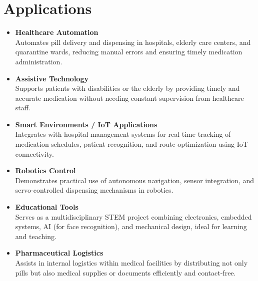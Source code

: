 \section{Applications}

\begin{itemize}
    \item \textbf{Healthcare Automation} \\
    Automates pill delivery and dispensing in hospitals, elderly care centers, and quarantine wards, reducing manual errors and ensuring timely medication administration.

    \item \textbf{Assistive Technology} \\
    Supports patients with disabilities or the elderly by providing timely and accurate medication without needing constant supervision from healthcare staff.

    \item \textbf{Smart Environments / IoT Applications} \\
    Integrates with hospital management systems for real-time tracking of medication schedules, patient recognition, and route optimization using IoT connectivity.

    \item \textbf{Robotics Control} \\
    Demonstrates practical use of autonomous navigation, sensor integration, and servo-controlled dispensing mechanisms in robotics.

    \item \textbf{Educational Tools} \\
    Serves as a multidisciplinary STEM project combining electronics, embedded systems, AI (for face recognition), and mechanical design, ideal for learning and teaching.

    \item \textbf{Pharmaceutical Logistics} \\
    Assists in internal logistics within medical facilities by distributing not only pills but also medical supplies or documents efficiently and contact-free.
\end{itemize}
